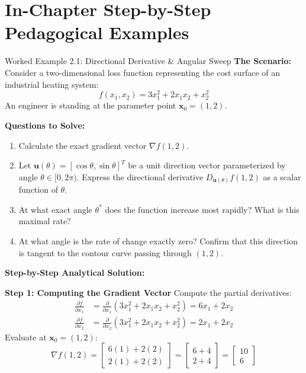 \section{In-Chapter Step-by-Step Pedagogical Examples}

\begin{examplebox}[breakable]{Worked Example 2.1: Directional Derivative \& Angular Sweep}
\label{ex:w02_directional_derivative}
\textbf{The Scenario:}
Consider a two-dimensional loss function representing the cost surface of an industrial heating system:
\begin{equation*}
f(x_1, x_2) = 3x_1^2 + 2x_1 x_2 + x_2^2
\end{equation*}
An engineer is standing at the parameter point $\mathbf{x}_0 = (1, 2)$.

\textbf{Questions to Solve:}
\begin{enumerate}
    \item Calculate the exact gradient vector $\nabla f(1, 2)$.
    \item Let $\mathbf{u}(\theta) = [\cos\theta, \sin\theta]^T$ be a unit direction vector parameterized by angle $\theta \in [0, 2\pi)$. Express the directional derivative $D_{\mathbf{u}(\theta)} f(1, 2)$ as a scalar function of $\theta$.
    \item At what exact angle $\theta^*$ does the function increase most rapidly? What is this maximal rate?
    \item At what angle is the rate of change exactly zero? Confirm that this direction is tangent to the contour curve passing through $(1, 2)$.
\end{enumerate}

\tcblower
\textbf{Step-by-Step Analytical Solution:}

\textbf{Step 1: Computing the Gradient Vector}
Compute the partial derivatives:
\begin{align*}
\frac{\partial f}{\partial x_1} &= \frac{\partial}{\partial x_1}(3x_1^2 + 2x_1 x_2 + x_2^2) = 6x_1 + 2x_2 \\
\frac{\partial f}{\partial x_2} &= \frac{\partial}{\partial x_2}(3x_1^2 + 2x_1 x_2 + x_2^2) = 2x_1 + 2x_2
\end{align*}
Evaluate at $\mathbf{x}_0 = (1, 2)$:
\begin{equation*}
\nabla f(1, 2) = \begin{bmatrix} 6(1) + 2(2) \\ 2(1) + 2(2) \end{bmatrix} = \begin{bmatrix} 6 + 4 \\ 2 + 4 \end{bmatrix} = \begin{bmatrix} 10 \\ 6 \end{bmatrix}
\end{equation*}


\end{examplebox}
